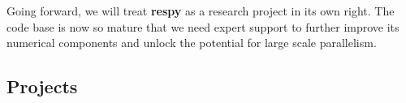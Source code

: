 \noindent Going forward, we will treat \textbf{respy} as a research project in its own right. The code base is now so mature that we need expert support to further improve its numerical components and unlock the potential for large scale parallelism.






\subsection{Projects}
